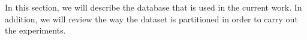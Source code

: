 In this section, we will describe the database that is used in the current work.
In addition, we will review the way the dataset is partitioned in order to carry out the experiments.


